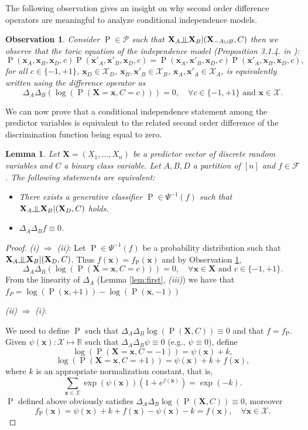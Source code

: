 \documentclass[11pt,a4paper, twoside]{book}
\newtheorem{lemma}{Lemma}[chapter]
\newtheorem{observation}{Observation}[chapter]
\newcommand{\indep}{\rotatebox[origin=c]{90}{$\models$}}
\newcommand{\Pp}{\operatorname{P}}
\newcommand{\bx}{\mathbf{x}}
\newcommand{\bX}{\mathbf{X}}
\newcommand{\bchi}{\boldsymbol{\mathcal{X}}}
\begin{document}
The following observation gives an insight on why second order difference operators are meaningful to analyze conditional independence models.
\begin{observation}
Consider $\Pp \in \mathcal{P}$ such that $\bX_A \indep \bX_B | (\bX_{-A \cup B}, C)$ then
we observe that the toric equation of the independence model (Proposition 3.1.4. in \citet{drton2009lectures}):
$$ \Pp(\bx_A,\bx_B,\bx_D,c)\Pp(\bx'_A,\bx'_B,\bx_D,c) =  \Pp(\bx_A,\bx'_B,\bx_D,c)\operatorname{P}(\bx'_A,\bx_B,\bx_D,c),$$ 
for all $c\in \{-1,+1\}$, $\bx_D \in \bchi_D$, $\bx_B,\bx'_B \in \bchi_B$, $\bx_A,\bx'_A \in \bchi_A$, is equivalently written using the difference operator as
$$ \Delta_A \Delta_B \left( \log (\Pp(\bX = \bx , C = c)) \right) = 0, \quad \forall c \in \{-1,+1\}\text{ and  }\bx \in \bchi.$$
\label{obs:toric}
\end{observation}
We can now prove that a conditional independence statement among the predictor variables is equivalent to the related second order difference of the discrimination function being equal to zero.
\begin{lemma}
Let $\mathbf{X}=(X_1,\ldots,X_n)$ be a predictor vector of discrete random variables and $C$ a binary class variable.  Let $A,B,D$ a partition of $[n]$ and $f \in \mathcal{F}$.
The following statements are equivalent:
\begin{itemize}
\item[(i)] There exists a generative classifier $\Pp \in \Psi^{-1}(f)$ such that $\bX_A \indep \bX_B | (\bX_{D}, C)$ holds.
\item[(ii)] $\Delta_{A}\Delta_{B}f\equiv 0$.
\end{itemize}
\label{lem:cisdisc}
\end{lemma}
\begin{proof}
\textit{(i)} $\Rightarrow$ \textit{(ii)}:
Let $\Pp \in \Psi^{-1}(f)$ be a probability distribution such that $\bX_A \indep \bX_B | (\bX_D, C)$. Thus $f(\bx)=f_{\Pp}(\bx)$ and by Observation \ref{obs:toric},
$$ \Delta_A \Delta_B \left( \log(\Pp(\bX=\bx,C=c)) \right)= 0, \quad \forall \bx \in \bX\text{ and } c\in \{-1,+1\}.$$ 
From the linearity of $\Delta_A$ (Lemma \ref{lem:first}, \textit{(iii)}) we have that 
$f_P =\log(\Pp(\bx,+1))-\log(\Pp(\bx,-1))$

 \textit{(ii)} $\Rightarrow$ \textit{(i)}:
 
We need to define $\Pp$ such that $\Delta_A \Delta_B \log(\Pp(\bX,C)) \equiv 0$ and that $f=f_{\Pp}$.
Given $\psi(\bx): \bchi \mapsto \mathbb{R}$ such that $\Delta_A\Delta_B \psi \equiv 0$ (e.g., $\psi \equiv 0$), define
$$ \log(\Pp(\bX = \bx, C=-1)) =  \psi(\bx) + k ,$$
$$ \log(\Pp(\bX = \bx, C=+1)) = \psi(\bx) + k + f(\bx), $$
where $k$ is an appropriate normalization constant, that is,
$$ \sum_{\bx \in \bchi}  \exp(\psi(\bx)) \left( 1+ e^{f(\bx)} \right) = \exp(-k).$$
$\Pp$ defined above obviously satisfies $\Delta_A\Delta_B\log(\Pp(\bX,C)) \equiv 0$, moreover 
$$f_{\Pp}(\bx)= \psi(\bx) + k + f(\bx) - \psi(\bx) - k = f(\bx), \quad \forall \bx \in \bchi.$$

 
\end{proof}
\end{document}
